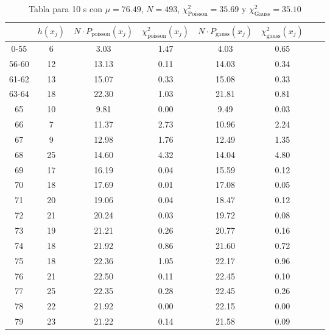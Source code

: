 \begin{center}
\begin{table}[H]
\caption{Tabla para 10 s con $\mu=76.49$, $N=493$, $\chi^2_{\text{Poisson}}=35.69$  y $\chi^2_{\text{Gauss}}=35.10$}
\label{Tab:histo__10s}
\begin{tabular}{cccccccc}
\toprule
 & $h(x_j)$ & $N \cdot P_{\text{poisson}} (x_j)$ & $\chi^2_{\text{poisson}}(x_j)$ & $N \cdot P_{\text{gauss}} (x_j)$ & $\chi^2_{\text{gauss}}(x_j)$ \\
\midrule
0-55 & \num{    6} & \num{3.03} & \num{1.47} & \num{4.03} & \num{0.65} \\
56-60 & \num{   12} & \num{13.13} & \num{0.11} & \num{14.03} & \num{0.34} \\
61-62 & \num{   13} & \num{15.07} & \num{0.33} & \num{15.08} & \num{0.33} \\
63-64 & \num{   18} & \num{22.30} & \num{1.03} & \num{21.81} & \num{0.81} \\
65 & \num{   10} & \num{9.81} & \num{0.00} & \num{9.49} & \num{0.03} \\
66 & \num{    7} & \num{11.37} & \num{2.73} & \num{10.96} & \num{2.24} \\
67 & \num{    9} & \num{12.98} & \num{1.76} & \num{12.49} & \num{1.35} \\
68 & \num{   25} & \num{14.60} & \num{4.32} & \num{14.04} & \num{4.80} \\
69 & \num{   17} & \num{16.19} & \num{0.04} & \num{15.59} & \num{0.12} \\
70 & \num{   18} & \num{17.69} & \num{0.01} & \num{17.08} & \num{0.05} \\
71 & \num{   20} & \num{19.06} & \num{0.04} & \num{18.47} & \num{0.12} \\
72 & \num{   21} & \num{20.24} & \num{0.03} & \num{19.72} & \num{0.08} \\
73 & \num{   19} & \num{21.21} & \num{0.26} & \num{20.77} & \num{0.16} \\
74 & \num{   18} & \num{21.92} & \num{0.86} & \num{21.60} & \num{0.72} \\
75 & \num{   18} & \num{22.36} & \num{1.05} & \num{22.17} & \num{0.96} \\
76 & \num{   21} & \num{22.50} & \num{0.11} & \num{22.45} & \num{0.10} \\
77 & \num{   25} & \num{22.35} & \num{0.28} & \num{22.45} & \num{0.26} \\
78 & \num{   22} & \num{21.92} & \num{0.00} & \num{22.15} & \num{0.00} \\
79 & \num{   23} & \num{21.22} & \num{0.14} & \num{21.58} & \num{0.09} \\

\end{tabular}
\end{table}
\end{center}
